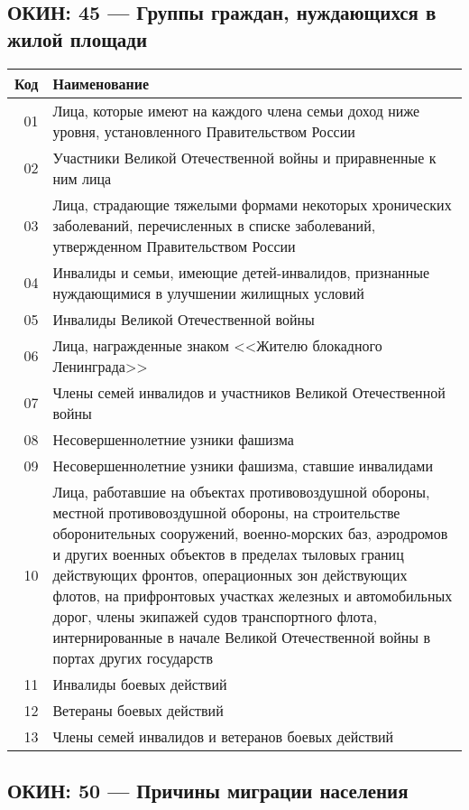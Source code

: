 \documentclass[10pt, a4paper, titlepage]{article}
\begin{document}
\subsection{ОКИН: 45 --- Группы граждан, нуждающихся в жилой площади}

\begin{center}
    \begin{longtable}{rp{}}
        \hline
        \textbf{Код} & \textbf{Наименование} \\ \hline
        01 & Лица, которые имеют на каждого члена семьи доход ниже уровня, установленного Правительством России \\
        02 & Участники Великой Отечественной войны и приравненные к ним лица \\
        03 & Лица, страдающие тяжелыми формами некоторых хронических заболеваний, перечисленных в списке заболеваний, утвержденном Правительством России \\
        04 & Инвалиды и семьи, имеющие детей-инвалидов, признанные нуждающимися в улучшении жилищных условий \\
        05 & Инвалиды Великой Отечественной войны \\
        06 & Лица, награжденные знаком <<Жителю блокадного Ленинграда>> \\
        07 & Члены семей инвалидов и участников Великой Отечественной войны \\
        08 & Несовершеннолетние узники фашизма \\
        09 & Несовершеннолетние узники фашизма, ставшие инвалидами \\
        10 & Лица, работавшие на объектах противовоздушной обороны, местной противовоздушной обороны, на строительстве оборонительных сооружений, военно-морских баз, аэродромов и других военных объектов в пределах тыловых границ действующих фронтов, операционных зон действующих флотов, на прифронтовых участках железных и автомобильных дорог, члены экипажей судов транспортного флота, интернированные в начале Великой Отечественной войны в портах других государств \\
        11 & Инвалиды боевых действий \\
        12 & Ветераны боевых действий \\
        13 & Члены семей инвалидов и ветеранов боевых действий \\
    \end{longtable}
\end{center}

\subsection{ОКИН: 50 --- Причины миграции населения}
\end{document}
